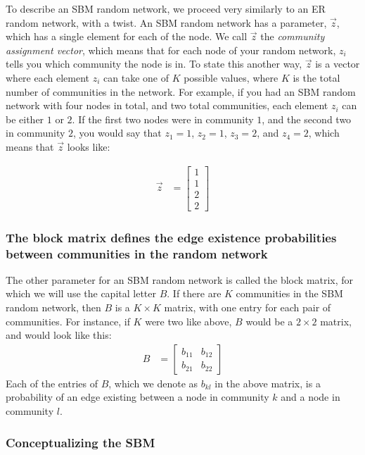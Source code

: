 To describe an SBM random network, we proceed very similarly to an ER random network, with a twist. An SBM random network has a parameter, $\vec z$, which has a single element for each of the node. We call $\vec z$ the \textit{community assignment vector}, which means that for each node of your random network, $z_i$ tells you which community the node is in. To state this another way, $\vec z$ is a vector where each element $z_i$ can take one of $K$ possible values, where $K$ is the total number of communities in the network. For example, if you had an SBM random network with four nodes in total, and two total communities, each element $z_i$ can be either $1$ or $2$. If the first two nodes were in community $1$, and the second two in community $2$, you would say that $z_1 = 1$, $z_2 = 1$, $z_3 = 2$, and $z_4 = 2$, which means that $\vec z$ looks like:

\begin{align*}
    \vec z &= \begin{bmatrix}1 \\ 1 \\ 2 \\ 2\end{bmatrix}
\end{align*}
\subsubsection{The block matrix defines the edge existence probabilities between communities in the random network}

The other parameter for an SBM random network is called the block matrix, for which we will use the capital letter $B$. If there are $K$ communities in the SBM random network, then $B$ is a $K \times K$ matrix, with one entry for each pair of communities. For instance, if $K$ were two like above, $B$ would be a $2 \times 2$ matrix, and would look like this:
\begin{align*}
    B &= \begin{bmatrix}
        b_{11} & b_{12} \\ b_{21} & b_{22}
    \end{bmatrix}
\end{align*}
Each of the entries of $B$, which we denote as $b_{kl}$ in the above matrix, is a probability of an edge existing between a node in community $k$ and a node in community $l$. 

\subsubsection{Conceptualizing the SBM}

